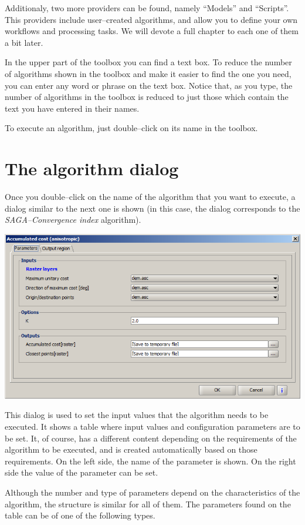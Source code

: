 Additionaly, two more providers can be found, namely ``Models'' and ``Scripts''. This providers include user--created algorithms, and allow you to define your own workflows and processing tasks. We will devote a full chapter to each one of them a bit later.

In the upper part of the toolbox you can find a text box. To reduce the number of algorithms shown in the toolbox and make it easier to find the one you need, you can enter any word or phrase on the text box. Notice that, as you type, the number of algorithms in the toolbox is reduced to just those which contain the text you have entered in their names.

To execute an algorithm, just double--click on its name in the toolbox.

\section{The algorithm dialog}

Once you double--click on the name of the algorithm that you want to execute, a dialog similar to the next one is shown (in this case, the dialog corresponds to the \emph{SAGA--Convergence index} algorithm).

\begin{center}
\includegraphics[width=.8\columnwidth]{accumulated_cost_anisotropic.png}
\end{center}

This dialog is used to set the input values that the algorithm needs to be executed. It shows a table where input values and configuration parameters are to be set. It, of course, has a different content depending on the requirements of the algorithm to be executed, and is created automatically based on those requirements. On the left side, the name of the parameter is shown. On the right side the value of the parameter can be set.

Although the number and type of parameters depend on the characteristics of the algorithm, the structure is similar for all of them. The parameters found on the table can be of one of the following types.

